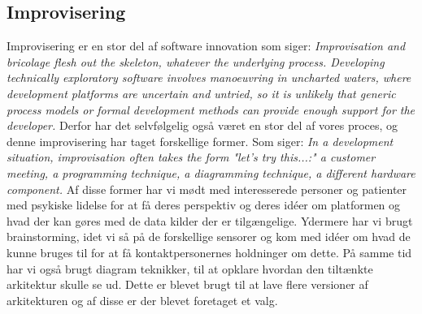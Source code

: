 \subsection{Improvisering}
Improvisering er en stor del af software innovation som \citet[side 56]{book:softwareinnovation} siger: \textit{Improvisation and bricolage flesh out the skeleton, whatever the underlying process. Developing technically exploratory software involves manoeuvring in uncharted waters, where development platforms are uncertain and untried, so it is unlikely that generic process models or formal development methods can provide enough support for the developer.}
Derfor har det selvfølgelig også været en stor del af vores proces, og denne improvisering har taget forskellige former.
Som \citet[side 56]{book:softwareinnovation} siger: \textit{In a development situation, improvisation often takes the form "let's try this...:" a customer meeting, a programming technique, a diagramming technique, a different hardware component.}
Af disse former har vi mødt med interesserede personer og patienter med psykiske lidelse for at få deres perspektiv og deres idéer om platformen og hvad der kan gøres med de data kilder der er tilgængelige. 
Ydermere har vi brugt brainstorming, idet vi så på de forskellige sensorer og kom med idéer om hvad de kunne bruges til for at få kontaktpersonernes holdninger om dette.
På samme tid har vi også brugt diagram teknikker, til at opklare hvordan den tiltænkte arkitektur skulle se ud.
Dette er blevet brugt til at lave flere versioner af arkitekturen og af disse er der blevet foretaget et valg.